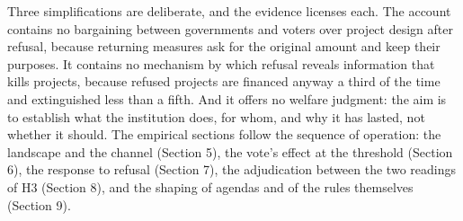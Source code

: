Three simplifications are deliberate, and the evidence licenses each. The account contains no bargaining between governments and voters over project design after refusal, because returning measures ask for the original amount and keep their purposes. It contains no mechanism by which refusal reveals information that kills projects, because refused projects are financed anyway a third of the time and extinguished less than a fifth. And it offers no welfare judgment: the aim is to establish what the institution does, for whom, and why it has lasted, not whether it should. The empirical sections follow the sequence of operation: the landscape and the channel (Section 5), the vote's effect at the threshold (Section 6), the response to refusal (Section 7), the adjudication between the two readings of H3 (Section 8), and the shaping of agendas and of the rules themselves (Section 9).

